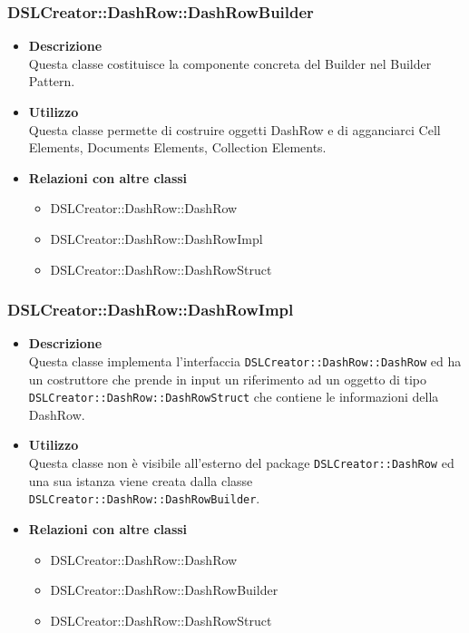                 \subsubsection{DSLCreator::DashRow::DashRowBuilder}
                    \begin{itemize}
                        \item \textbf{Descrizione} \hfill \\
                            Questa classe costituisce la componente concreta del Builder nel Builder Pattern.
                        \item \textbf{Utilizzo} \hfill \\
                            Questa classe permette di costruire oggetti DashRow e di agganciarci Cell Elements, Documents Elements, Collection Elements.
                        \item \textbf{Relazioni con altre classi}
                            \begin{itemize}
                              \item DSLCreator::DashRow::DashRow
                              \item DSLCreator::DashRow::DashRowImpl
                              \item DSLCreator::DashRow::DashRowStruct
                            \end{itemize}
                    \end{itemize}

 \subsubsection{DSLCreator::DashRow::DashRowImpl}
                    \begin{itemize}
                        \item \textbf{Descrizione} \hfill \\
                            Questa classe implementa l'interfaccia \texttt{DSLCreator::DashRow::DashRow} ed ha un costruttore che prende in input un riferimento ad un oggetto di tipo \texttt{DSLCreator::Dash\-Row::DashRowStruct} che contiene le informazioni della DashRow.
                        \item \textbf{Utilizzo} \hfill \\
                            Questa classe non è visibile all'esterno del package \texttt{DSLCreator::DashRow} ed una sua istanza viene creata dalla classe \texttt{DSLCreator::DashRow::DashRowBuilder}.
                        \item \textbf{Relazioni con altre classi}
                            \begin{itemize}
                              \item DSLCreator::DashRow::DashRow
                              \item DSLCreator::DashRow::DashRowBuilder
                              \item DSLCreator::DashRow::DashRowStruct
                            \end{itemize}
                    \end{itemize}

